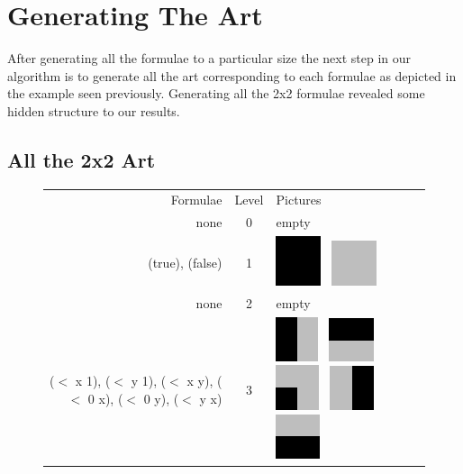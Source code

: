 \section{Generating The Art}

After generating all the formulae to a particular size the next step in our algorithm is
to generate all the art corresponding to each formulae as depicted in the example seen
previously. Generating all the 2x2 formulae revealed some hidden structure to our results.

\subsection{All the 2x2 Art}
\begin{figure}
\begin{center}
\begin{tabular}{r c l}
Formulae & Level & Pictures \\
\tiny{none} & 0 & empty \\
\tiny{(true), (false)} & 1 &
    \includegraphics[width=.25in]{../presentation/2x2/Shape1LVL1.png}~
    \includegraphics[width=.25in]{../presentation/2x2/Shape2LVL1.png} \\
\tiny{none} & 2 & empty \\
\tiny{($<$ x 1), ($<$ y 1), ($<$ x y), ($<$ 0 x), ($<$ 0 y), ($<$ y x)} & 3 & 
    \includegraphics[width=.25in]{../presentation/2x2/Shape1LVL3.png}~
    \includegraphics[width=.25in]{../presentation/2x2/Shape2LVL3.png}~
    \includegraphics[width=.25in]{../presentation/2x2/Shape5LVL3.png}~
    \includegraphics[width=.25in]{../presentation/2x2/Shape6LVL3.png}~
    \includegraphics[width=.25in]{../presentation/2x2/Shape3LVL3.png}~

\end{tabular}
\end{center}
\end{figure}
